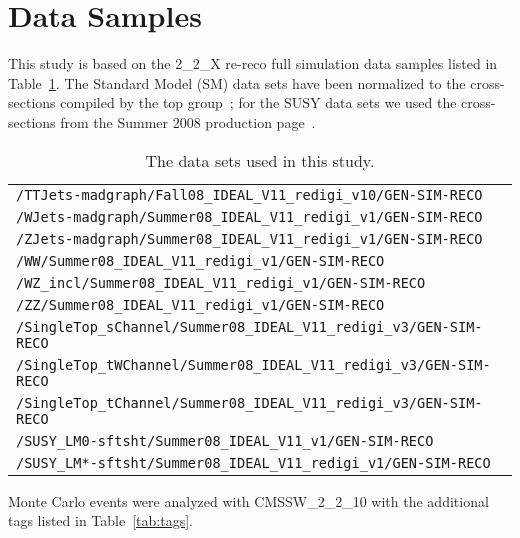 \section{Data Samples}
\label{sec:datasamples}
This study is based on the 2\_2\_X re-reco full simulation data samples
listed in Table~\ref{tab:datasets}.  The Standard Model (SM) data sets have been normalized 
to the cross-sections compiled by the top group~\cite{tosi};  for the SUSY 
data sets we used the cross-sections from the Summer 2008 production 
page~\cite{summer08}.

\begin{table}[hbt]
\begin{center}
\begin{tabular}{|l|}\hline
{\tt /TTJets-madgraph/Fall08\_IDEAL\_V11\_redigi\_v10/GEN-SIM-RECO} \\
{\tt /WJets-madgraph/Summer08\_IDEAL\_V11\_redigi\_v1/GEN-SIM-RECO} \\
{\tt /ZJets-madgraph/Summer08\_IDEAL\_V11\_redigi\_v1/GEN-SIM-RECO} \\
{\tt /WW/Summer08\_IDEAL\_V11\_redigi\_v1/GEN-SIM-RECO} \\
{\tt /WZ\_incl/Summer08\_IDEAL\_V11\_redigi\_v1/GEN-SIM-RECO} \\
{\tt /ZZ/Summer08\_IDEAL\_V11\_redigi\_v1/GEN-SIM-RECO} \\
{\tt /SingleTop\_sChannel/Summer08\_IDEAL\_V11\_redigi\_v3/GEN-SIM-RECO} \\
{\tt /SingleTop\_tWChannel/Summer08\_IDEAL\_V11\_redigi\_v3/GEN-SIM-RECO} \\
{\tt /SingleTop\_tChannel/Summer08\_IDEAL\_V11\_redigi\_v3/GEN-SIM-RECO} \\
{\tt /SUSY\_LM0-sftsht/Summer08\_IDEAL\_V11\_v1/GEN-SIM-RECO} \\
{\tt /SUSY\_LM*-sftsht/Summer08\_IDEAL\_V11\_redigi\_v1/GEN-SIM-RECO} \\
\hline
\end{tabular}
\caption{The data sets used in this study.\label{tab:datasets}}
\end{center}
\end{table}

Monte Carlo events were analyzed with CMSSW\_2\_2\_10 
with the additional tags listed in Table~\ref{tab:tags}.

